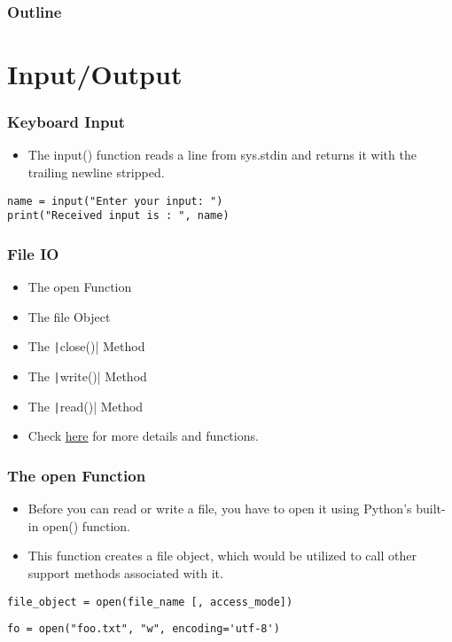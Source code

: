 \documentclass{../py-lecture}
\subtitle{Packages}
\begin{document}
\begin{frame}
  \titlepage{}
\end{frame}
\begin{frame}
  \frametitle{Outline}
  \tableofcontents{}
\end{frame}

\section{Input/Output}

\begin{frame}[fragile]
	\frametitle{Keyboard Input}
    \begin{itemize}
      \item The input() function reads a line from sys.stdin and
        returns it with the trailing newline stripped.
    \end{itemize}
    \begin{verbatim}
name = input("Enter your input: ")
print("Received input is : ", name)
    \end{verbatim}
\end{frame}

\begin{frame}
	\frametitle{File IO}
  \begin{itemize}
    \item The open Function
    \item The file Object
    \item The \texttt|close()| Method
    \item The \texttt|write()| Method
    \item The \texttt|read()| Method
    \item Check
    \href{https://docs.python.org/3/library/functions.html}{here}
    for more details and functions.
  \end{itemize}
\end{frame}

\begin{frame}[fragile]
	\frametitle{The open Function}
  \begin{itemize}
    \item Before you can read or write a file,
    you have to open it using Python's built-in open() function.
    \item This function creates a file object, which would be utilized
    to call other support methods associated with it.
  \end{itemize}
  \begin{verbatim}
file_object = open(file_name [, access_mode])
	\end{verbatim}
  \begin{verbatim}
fo = open("foo.txt", "w", encoding='utf-8')
	\end{verbatim}
\end{frame}
\end{document}
